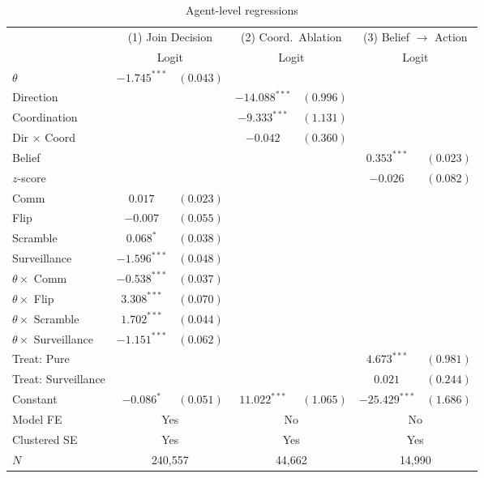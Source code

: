 \begin{table}[htbp]
\centering
\scriptsize
\caption{Agent-level regressions}
\label{tab:regressions}
\begin{tabular}{lcccccc}
\toprule
 & \multicolumn{2}{c}{(1) Join Decision} & \multicolumn{2}{c}{(2) Coord.\ Ablation} & \multicolumn{2}{c}{(3) Belief $\to$ Action} \\
 & \multicolumn{2}{c}{Logit} & \multicolumn{2}{c}{Logit} & \multicolumn{2}{c}{Logit} \\
\midrule
$\theta$ & $-1.745^{***}$ & $(0.043)$ &  &  &  &  \\
Direction &  &  & $-14.088^{***}$ & $(0.996)$ &  &  \\
Coordination &  &  & $-9.333^{***}$ & $(1.131)$ &  &  \\
Dir $\times$ Coord &  &  & $-0.042$ & $(0.360)$ &  &  \\
Belief &  &  &  &  & $0.353^{***}$ & $(0.023)$ \\
$z$-score &  &  &  &  & $-0.026$ & $(0.082)$ \\
Comm & $0.017$ & $(0.023)$ &  &  &  &  \\
Flip & $-0.007$ & $(0.055)$ &  &  &  &  \\
Scramble & $0.068^{*}$ & $(0.038)$ &  &  &  &  \\
Surveillance & $-1.596^{***}$ & $(0.048)$ &  &  &  &  \\
$\theta \times$ Comm & $-0.538^{***}$ & $(0.037)$ &  &  &  &  \\
$\theta \times$ Flip & $3.308^{***}$ & $(0.070)$ &  &  &  &  \\
$\theta \times$ Scramble & $1.702^{***}$ & $(0.044)$ &  &  &  &  \\
$\theta \times$ Surveillance & $-1.151^{***}$ & $(0.062)$ &  &  &  &  \\
Treat: Pure &  &  &  &  & $4.673^{***}$ & $(0.981)$ \\
Treat: Surveillance &  &  &  &  & $0.021$ & $(0.244)$ \\
Constant & $-0.086^{*}$ & $(0.051)$ & $11.022^{***}$ & $(1.065)$ & $-25.429^{***}$ & $(1.686)$ \\
\midrule
Model FE & \multicolumn{2}{c}{Yes} & \multicolumn{2}{c}{No} & \multicolumn{2}{c}{No} \\
Clustered SE & \multicolumn{2}{c}{Yes} & \multicolumn{2}{c}{Yes} & \multicolumn{2}{c}{Yes} \\
$N$ & \multicolumn{2}{c}{240,557} & \multicolumn{2}{c}{44,662} & \multicolumn{2}{c}{14,990} \\

\end{tabular}
\end{table}
